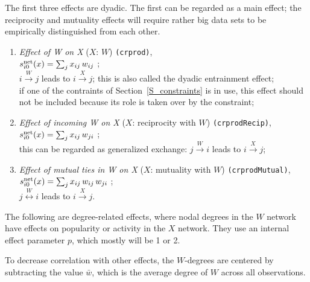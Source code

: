 \documentclass[a4paper,fleqn,11pt]{article}
\newcommand{\+}{\, + \,}
\newcommand{\vit}{\theenumi}
\newcounter{savenumi}
\begin{document}
The first three effects are dyadic. The first can be regarded
as a main effect; the reciprocity and mutuality effects
will require rather big data sets to be empirically distinguished
from each other.
\begin{enumerate}
 \item {\em Effect of W on X} ($X$: $W$)  \texttt{(crprod)},\\
 $s^{\rm net}_{i\vit}(x) = \sum_j x_{ij} \, w_{ij}  $ ;\\
 $i \stackrel{W}{\rightarrow} j$ leads to  $i \stackrel{X}{\rightarrow} j$;
 this is also called the dyadic entrainment effect;\\
 if one of the contraints of Section~\ref{S_constraints} is in use,
 this effect should not be included because its role is taken over by the
 constraint;

 \item {\em Effect of incoming W on X} ($X$: reciprocity with $W$)  \texttt{(crprodRecip)},\\
 $s^{\rm net}_{i\vit}(x) = \sum_j x_{ij} \, w_{ji}  $ ;\\
 this can be regarded as generalized exchange:
 $j \stackrel{W}{\rightarrow} i$ leads to  $i \stackrel{X}{\rightarrow} j$;

 \item {\em Effect of mutual ties in W on X} ($X$: mutuality with $W$)  \texttt{(crprodMutual)},\\
 $s^{\rm net}_{i\vit}(x) = \sum_j x_{ij} \, w_{ij} \, w_{ji}  $ ;\\
 $j \stackrel{W}{\leftrightarrow} i$ leads to  $i \stackrel{X}{\rightarrow} j$.
\setcounter{savenumi}{\value{enumi}}
\end{enumerate}
\smallskip
The following are degree-related effects, where nodal degrees
in the $W$ network have effects on popularity or activity in the
$X$  network. They use an internal effect parameter $p$, which
mostly will be 1 or 2.

To decrease correlation with other effects, the
$W$-degrees are centered by subtracting the value $\bar w$,
which is the average degree of $W$ across all observations.
\end{document}
